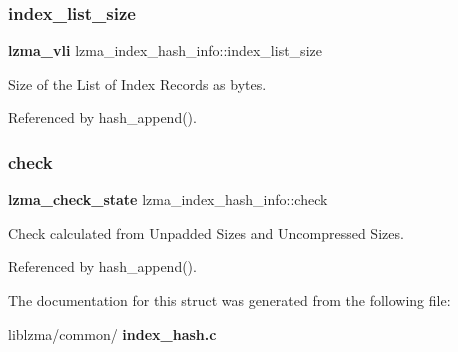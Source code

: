 \subsubsection{index\+\_\+list\+\_\+size}
{\footnotesize\ttfamily \textbf{ lzma\+\_\+vli} lzma\+\_\+index\+\_\+hash\+\_\+info\+::index\+\_\+list\+\_\+size}



Size of the List of Index Records as bytes. 



Referenced by hash\+\_\+append().

\mbox{\label{structlzma__index__hash__info_a80edd4084ad4718897628e52a152dad3}} 
\subsubsection{check}
{\footnotesize\ttfamily \textbf{ lzma\+\_\+check\+\_\+state} lzma\+\_\+index\+\_\+hash\+\_\+info\+::check}



Check calculated from Unpadded Sizes and Uncompressed Sizes. 



Referenced by hash\+\_\+append().



The documentation for this struct was generated from the following file\+:\begin{DoxyCompactItemize}
\item 
liblzma/common/\textbf{ index\+\_\+hash.\+c}\end{DoxyCompactItemize}
